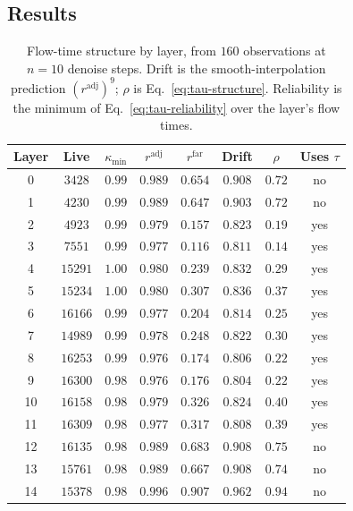 \subsection{Results}

\begin{table}[t]
\caption{Flow-time structure by layer, from $160$ observations at $n=10$ denoise
steps. Drift is the smooth-interpolation prediction
$(r^{\mathrm{adj}})^{9}$; $\rho$ is Eq.~\ref{eq:tau-structure}. Reliability is
the minimum of Eq.~\ref{eq:tau-reliability} over the layer's flow times.}
\label{tab:tau-layers}
\begin{center}
\small
\begin{tabular}{ccccccc|c}
\hline
Layer & Live & $\kappa_{\min}$ & $r^{\mathrm{adj}}$ & $r^{\mathrm{far}}$ & Drift & $\rho$ & Uses $\tau$ \\
\hline
0  & $3428$  & $0.99$ & $0.989$ & $0.654$ & $0.908$ & $0.72$ & no \\
1  & $4230$  & $0.99$ & $0.989$ & $0.647$ & $0.903$ & $0.72$ & no \\
2  & $4923$  & $0.99$ & $0.979$ & $0.157$ & $0.823$ & $0.19$ & yes \\
3  & $7551$  & $0.99$ & $0.977$ & $0.116$ & $0.811$ & $0.14$ & yes \\
4  & $15291$ & $1.00$ & $0.980$ & $0.239$ & $0.832$ & $0.29$ & yes \\
5  & $15234$ & $1.00$ & $0.980$ & $0.307$ & $0.836$ & $0.37$ & yes \\
6  & $16166$ & $0.99$ & $0.977$ & $0.204$ & $0.814$ & $0.25$ & yes \\
7  & $14989$ & $0.99$ & $0.978$ & $0.248$ & $0.822$ & $0.30$ & yes \\
8  & $16253$ & $0.99$ & $0.976$ & $0.174$ & $0.806$ & $0.22$ & yes \\
9  & $16300$ & $0.98$ & $0.976$ & $0.176$ & $0.804$ & $0.22$ & yes \\
10 & $16158$ & $0.98$ & $0.979$ & $0.326$ & $0.824$ & $0.40$ & yes \\
11 & $16309$ & $0.98$ & $0.977$ & $0.317$ & $0.808$ & $0.39$ & yes \\
12 & $16135$ & $0.98$ & $0.989$ & $0.683$ & $0.908$ & $0.75$ & no \\
13 & $15761$ & $0.98$ & $0.989$ & $0.667$ & $0.908$ & $0.74$ & no \\
14 & $15378$ & $0.98$ & $0.996$ & $0.907$ & $0.962$ & $0.94$ & no \\

\end{tabular}
\end{center}
\end{table}
